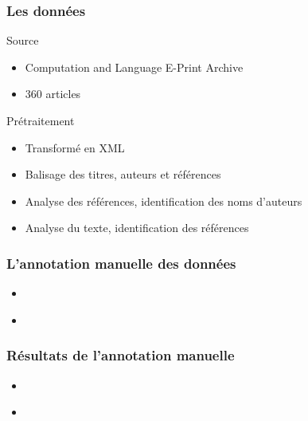 \documentclass[10pt]{beamer}
\begin{document}
\begin{frame}
  \frametitle{Les données}
  
  \begin{block}{Source}
  \begin{itemize}
    \item Computation and Language E-Print Archive
    \item 360 articles
  \end{itemize}
  \end{block}
  
  \begin{block}{Prétraitement}
  \begin{itemize}
    \item Transformé en XML
    \item Balisage des titres, auteurs et références
    \item Analyse des références, identification des noms d'auteurs
    \item Analyse du texte, identification des références
  \end{itemize}
  \end{block}
\end{frame}

\begin{frame}
  \frametitle{L'annotation manuelle des données}
  
  \begin{block}{}
  \begin{itemize}
    \item 
  \end{itemize}
  \end{block}
  
  \begin{block}{}
  \begin{itemize}
    \item 
  \end{itemize}
  \end{block}
\end{frame}

\begin{frame}
  \frametitle{Résultats de l'annotation manuelle}
  
  \begin{block}{}
  \begin{itemize}
    \item 
  \end{itemize}
  \end{block}
  
  \begin{block}{}
  \begin{itemize}
    \item 
  \end{itemize}
  \end{block}
\end{frame}
\end{document}
